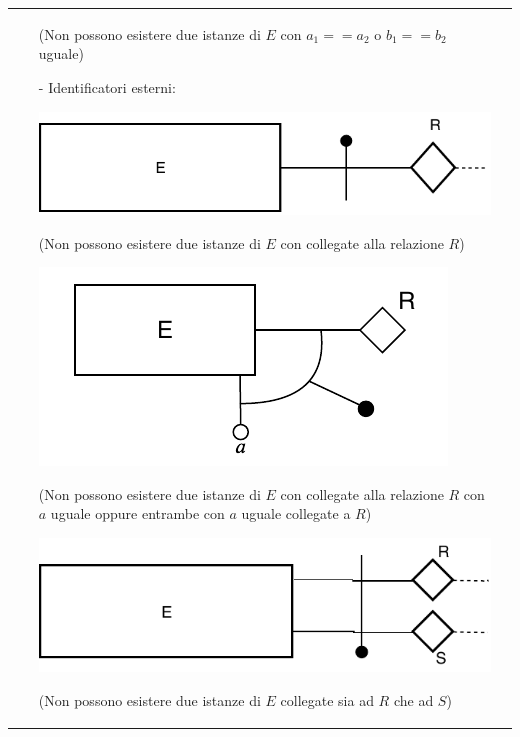 \documentclass[a4paper, 10pt]{report}
\begin{document}
\begin{longtable}{| p{} | p{} |}
\begin{itemize}
(Non possono esistere due istanze di $E$ con $a_1 == a_2$ o $b_1 == b_2$ uguale)

\item[-] Identificatori esterni:

\begin{center}
\includegraphics[scale=0.55]{14ottobre05.pdf}
\end{center}

(Non possono esistere due istanze di $E$ con collegate alla relazione $R$)

\begin{center}
\includegraphics[scale=0.65]{14ottobre06.pdf}
\end{center}

(Non possono esistere due istanze di $E$ con collegate alla relazione $R$ con $a$ uguale oppure entrambe con $a$ uguale collegate a $R$)

\begin{center}
\includegraphics[scale=0.55]{14ottobre07.pdf}
\end{center}

(Non possono esistere due istanze di $E$ collegate sia ad $R$ che ad $S$)

\end{itemize}
\end{longtable}
\end{document}
